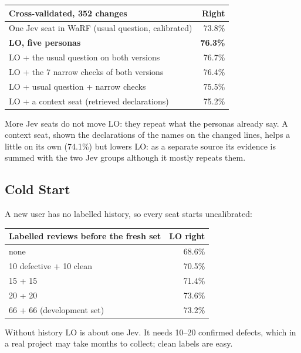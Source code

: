 \documentclass[11pt,a4paper]{article}
\begin{document}
\begin{center}
\begin{tabular}{lr}
\toprule
Cross-validated, 352 changes & Right \\
\midrule
One Jev seat in WaRF (usual question, calibrated)  & 73.8\% \\
\textbf{LO, five personas}                         & \textbf{76.3\%} \\
LO + the usual question on both versions           & 76.7\% \\
LO + the 7 narrow checks of both versions          & 76.4\% \\
LO + usual question + narrow checks                & 75.5\% \\
LO + a context seat (retrieved declarations)       & 75.2\% \\
\bottomrule
\end{tabular}
\end{center}

More Jev seats do not move LO: they repeat what the personas already say. A
context seat, shown the declarations of the names on the changed lines, helps a
little on its own (74.1\%) but lowers LO: as a separate source its evidence is
summed with the two Jev groups although it mostly repeats them.

\subsection{Cold Start}

A new user has no labelled history, so every seat starts uncalibrated:

\begin{center}
\begin{tabular}{lr}
\toprule
Labelled reviews before the fresh set & LO right \\
\midrule
none                         & 68.6\% \\
10 defective + 10 clean      & 70.5\% \\
15 + 15                      & 71.4\% \\
20 + 20                      & 73.6\% \\
66 + 66 (development set)    & 73.2\% \\
\bottomrule
\end{tabular}
\end{center}

Without history LO is about one Jev. It needs 10--20 confirmed defects, which in
a real project may take months to collect; clean labels are easy.
\end{document}

